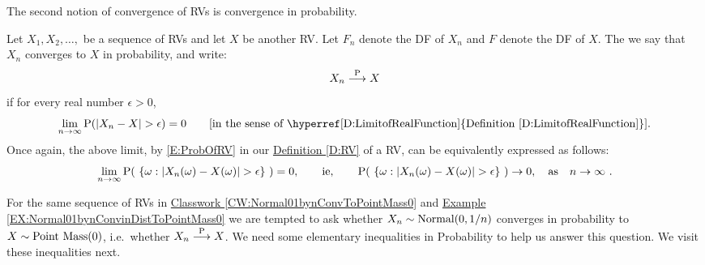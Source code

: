 The second notion of convergence of RVs is convergence in probability.

\begin{definition}\label{D:ConvInProb}
Let $X_1,X_2,\ldots,$ be a sequence of RVs and let $X$ be another RV.  Let $F_n$ denote the DF of $X_n$ and $F$ denote the DF of $X$.  The we say that $X_n$ converges to $X$ in probability, and write:
\[
X_n \overset{\P}{\longrightarrow} X
\]
if for every real number $\epsilon > 0$,
\[
\lim_{n \rightarrow \infty} \P(|X_n-X|> \epsilon) = 0 \qquad \text{[in the sense of \hyperref[D:LimitofRealFunction]{Definition \ref*{D:LimitofRealFunction}}].}
\]
Once again, the above limit, by \eqref{E:ProbOfRV} in our \hyperref[D:RV]{Definition \ref*{D:RV}} of a RV, can be equivalently expressed as follows: 
\[
\lim_{n \rightarrow \infty} \P( \ \{\omega: |X_n(\omega) - X(\omega)| > \epsilon\} \ )=0, \qquad \text{ie,} \qquad \P( \ \{\omega: |X_n(\omega) - X(\omega)| > \epsilon\} \ ) \rightarrow 0, \quad \text{as} \quad n \rightarrow \infty \ .
\]
\end{definition}
 
For the same sequence of RVs in  \hyperref[CW:Normal01bynConvToPointMass0]{Classwork \ref*{CW:Normal01bynConvToPointMass0}} and \hyperref[EX:Normal01bynConvinDistToPointMass0]{Example \ref*{EX:Normal01bynConvinDistToPointMass0}} we are tempted to ask whether $X_n \sim \normal(0,1/n)$ converges in probability to $X \sim \pointmass(0)$, i.e.~whether $X_n \overset{\P}{\longrightarrow} X$.  We need some elementary inequalities in Probability to help us answer this question.  We visit these inequalities next.


